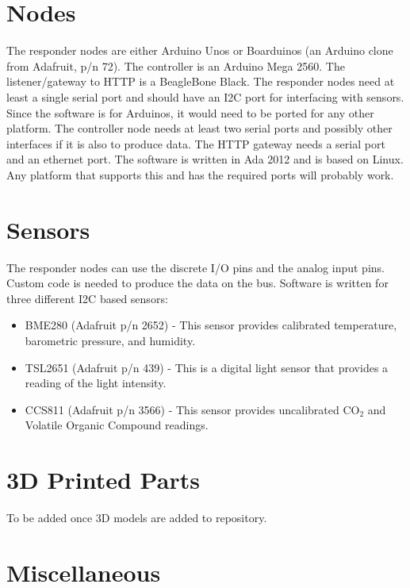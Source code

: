 \documentclass[10pt, openany, draft]{article}
\begin{document}
\section{Nodes}
The responder nodes are either Arduino Unos or Boarduinos (an Arduino clone from Adafruit, p/n 72).  The controller is an Arduino Mega 2560.  The listener/gateway to HTTP is a BeagleBone Black.  The responder nodes need at least a single serial port and should have an I2C port for interfacing with sensors.  Since the software is for Arduinos, it would need to be ported for any other platform.  The controller node needs at least two serial ports and possibly other interfaces if it is also to produce data.  The HTTP gateway needs a serial port and an ethernet port.  The software is written in Ada 2012 and is based on Linux.  Any platform that supports this and has the required ports will probably work.

\section{Sensors}
The responder nodes can use the discrete I/O pins and the analog input pins.  Custom code is needed to produce the data on the bus.  Software is written for three different I2C based sensors:
\begin{itemize}
  \item BME280 (Adafruit p/n 2652) - This sensor provides calibrated temperature, barometric pressure, and humidity.
  \item TSL2651 (Adafruit p/n 439) - This is a digital light sensor that provides a reading of the light intensity.
  \item CCS811 (Adafruit p/n 3566) - This sensor provides uncalibrated CO$_2$ and Volatile Organic Compound readings.
\end{itemize}

\section{3D Printed Parts}
To be added once 3D models are added to repository.

\section{Miscellaneous}
\end{document}
